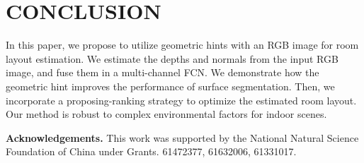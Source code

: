 \section{CONCLUSION}
\label{sec:Con}

In this paper, we propose to utilize geometric hints with an RGB image for room layout estimation. We estimate the depths and normals from the input RGB　image, and fuse them in a multi-channel FCN. 
We demonstrate how the geometric hint improves the performance of surface segmentation. 
Then, we incorporate a proposing-ranking strategy to optimize the estimated room layout. 
Our method is robust to complex environmental factors for indoor scenes.

\vspace{0.1cm}
\noindent\textbf{Acknowledgements.} This work was supported by the National Natural Science Foundation of China under Grants. 61472377, 61632006, 61331017.